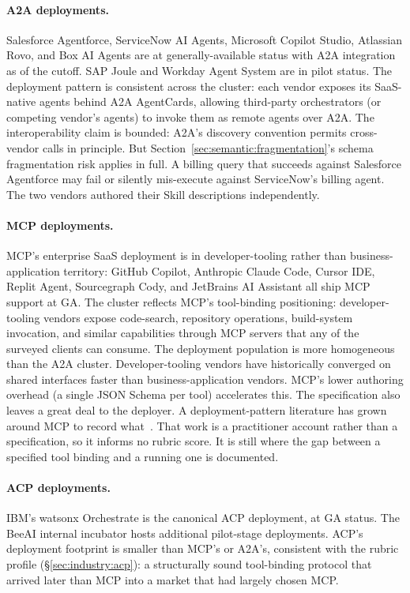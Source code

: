 \paragraph{A2A deployments.}
Salesforce Agentforce, ServiceNow AI Agents, Microsoft
Copilot Studio, Atlassian Rovo, and Box AI Agents are at
generally-available status with A2A integration as of the
cutoff. SAP Joule and Workday Agent System are in pilot
status. The deployment pattern is consistent across the
cluster: each vendor exposes its SaaS-native agents
behind A2A AgentCards, allowing third-party orchestrators
(or competing vendor's agents) to invoke them as remote
agents over A2A. The interoperability claim is bounded:
A2A's discovery convention permits cross-vendor calls in
principle. But Section~\ref{sec:semantic:fragmentation}'s
schema fragmentation risk applies in full. A
billing query that succeeds against Salesforce
Agentforce may fail or silently mis-execute against
ServiceNow's billing agent. The two vendors
authored their Skill descriptions independently.

\paragraph{MCP deployments.}
MCP's enterprise SaaS deployment is in developer-tooling
rather than business-application territory: GitHub Copilot,
Anthropic Claude Code, Cursor IDE, Replit Agent,
Sourcegraph Cody, and JetBrains AI Assistant all ship MCP
support at GA. The cluster reflects MCP's tool-binding
positioning: developer-tooling vendors expose
code-search, repository operations, build-system
invocation, and similar capabilities through MCP servers
that any of the surveyed clients can consume.
The deployment population is more homogeneous than
the A2A cluster. Developer-tooling vendors have
historically converged on shared interfaces faster than
business-application vendors. MCP's lower authoring
overhead (a single JSON Schema per tool) accelerates this.
The specification also leaves a great deal to the deployer.
A deployment-pattern literature has grown around MCP to
record what~\cite{bridging_protocol_prod}. That work is a
practitioner account rather than a specification, so it
informs no rubric score. It is still where the gap between
a specified tool binding and a running one is documented.

\paragraph{ACP deployments.}
IBM's watsonx Orchestrate is the canonical ACP
deployment, at GA status. The BeeAI internal
incubator hosts additional pilot-stage deployments.
ACP's deployment footprint is smaller than MCP's or
A2A's, consistent with the rubric profile
(\S\ref{sec:industry:acp}): a structurally
sound tool-binding protocol that arrived later than
MCP into a market that had largely chosen MCP.

